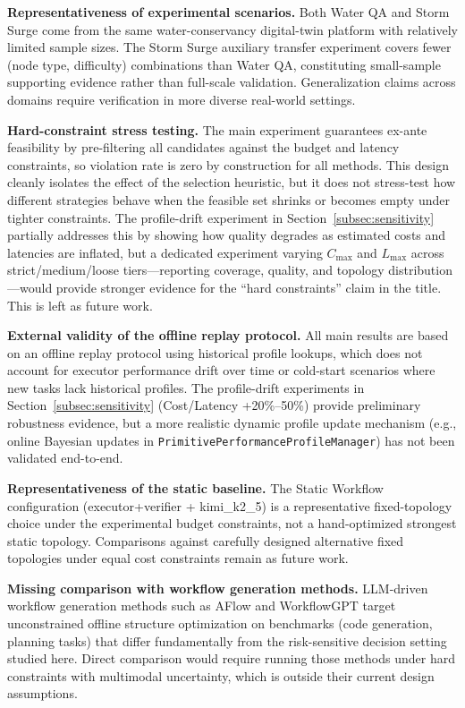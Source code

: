 \documentclass[manuscript,review,anonymous]{acmart}
\begin{document}
\textbf{Representativeness of experimental scenarios.} Both Water QA and Storm Surge come from the same water-conservancy digital-twin platform with relatively limited sample sizes. The Storm Surge auxiliary transfer experiment covers fewer (node type, difficulty) combinations than Water QA, constituting small-sample supporting evidence rather than full-scale validation. Generalization claims across domains require verification in more diverse real-world settings.

\textbf{Hard-constraint stress testing.} The main experiment guarantees ex-ante feasibility by pre-filtering all candidates against the budget and latency constraints, so violation rate is zero by construction for all methods. This design cleanly isolates the effect of the selection heuristic, but it does not stress-test how different strategies behave when the feasible set shrinks or becomes empty under tighter constraints. The profile-drift experiment in Section~\ref{subsec:sensitivity} partially addresses this by showing how quality degrades as estimated costs and latencies are inflated, but a dedicated experiment varying $C_{\max}$ and $L_{\max}$ across strict/medium/loose tiers---reporting coverage, quality, and topology distribution---would provide stronger evidence for the ``hard constraints'' claim in the title. This is left as future work.

\textbf{External validity of the offline replay protocol.} All main results are based on an offline replay protocol using historical profile lookups, which does not account for executor performance drift over time or cold-start scenarios where new tasks lack historical profiles. The profile-drift experiments in Section~\ref{subsec:sensitivity} (Cost/Latency +20\%--50\%) provide preliminary robustness evidence, but a more realistic dynamic profile update mechanism (e.g., online Bayesian updates in \texttt{PrimitivePerformanceProfileManager}) has not been validated end-to-end.

\textbf{Representativeness of the static baseline.} The Static Workflow configuration (executor+verifier + kimi\_k2\_5) is a representative fixed-topology choice under the experimental budget constraints, not a hand-optimized strongest static topology. Comparisons against carefully designed alternative fixed topologies under equal cost constraints remain as future work.

\textbf{Missing comparison with workflow generation methods.} LLM-driven workflow generation methods such as AFlow and WorkflowGPT target unconstrained offline structure optimization on benchmarks (code generation, planning tasks) that differ fundamentally from the risk-sensitive decision setting studied here. Direct comparison would require running those methods under hard constraints with multimodal uncertainty, which is outside their current design assumptions.
\end{document}
